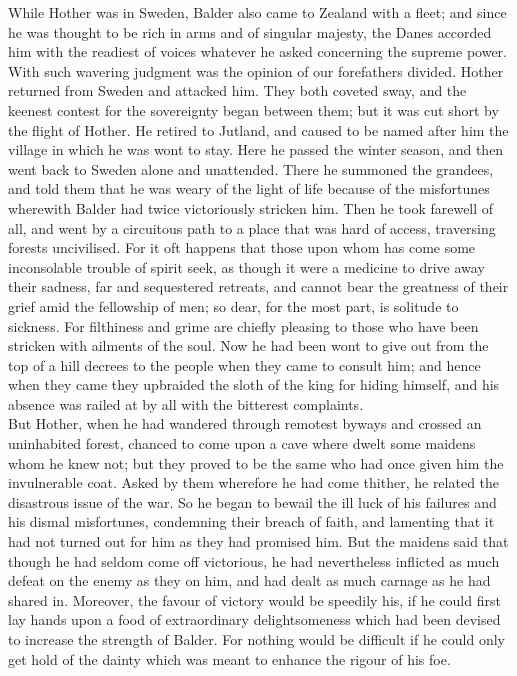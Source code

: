 \documentclass[10pt,a4paper]{report}
\begin{document}
While Hother was in Sweden, Balder also came to Zealand with a fleet; and since he was thought to be rich in arms and of singular majesty, the Danes accorded him with the readiest of voices whatever he asked concerning the supreme power. With such wavering judgment was the opinion of our forefathers divided. Hother returned from Sweden and attacked him. They both coveted sway, and the keenest contest for the sovereignty began between them; but it was cut short by the flight of Hother. He retired to Jutland, and caused to be named after him the village in which he was wont to stay. Here he passed the winter season, and then went back to Sweden alone and unattended. There he summoned the grandees, and told them that he was weary of the light of life because of the misfortunes wherewith Balder had twice victoriously stricken him. Then he took farewell of all, and went by a circuitous path to a place that was hard of access, traversing forests uncivilised. For it oft happens that those upon whom has come some inconsolable trouble of spirit seek, as though it were a medicine to drive away their sadness, far and sequestered retreats, and cannot bear the greatness of their grief amid the fellowship of men; so dear, for the most part, is solitude to sickness. For filthiness and grime are chiefly pleasing to those who have been stricken with ailments of the soul. Now he had been wont to give out from the top of a hill decrees to the people when they came to consult him; and hence when they came they upbraided the sloth of the king for hiding himself, and his absence was railed at by all with the bitterest complaints.\\

But Hother, when he had wandered through remotest byways and crossed an uninhabited forest, chanced to come upon a cave where dwelt some maidens whom he knew not; but they proved to be the same who had once given him the invulnerable coat. Asked by them wherefore he had come thither, he related the disastrous issue of the war. So he began to bewail the ill luck of his failures and his dismal misfortunes, condemning their breach of faith, and lamenting that it had not turned out for him as they had promised him. But the maidens said that though he had seldom come off victorious, he had nevertheless inflicted as much defeat on the enemy as they on him, and had dealt as much carnage as he had shared in. Moreover, the favour of victory would be speedily his, if he could first lay hands upon a food of extraordinary delightsomeness which had been devised to increase the strength of Balder. For nothing would be difficult if he could only get hold of the dainty which was meant to enhance the rigour of his foe.\\
\end{document}
